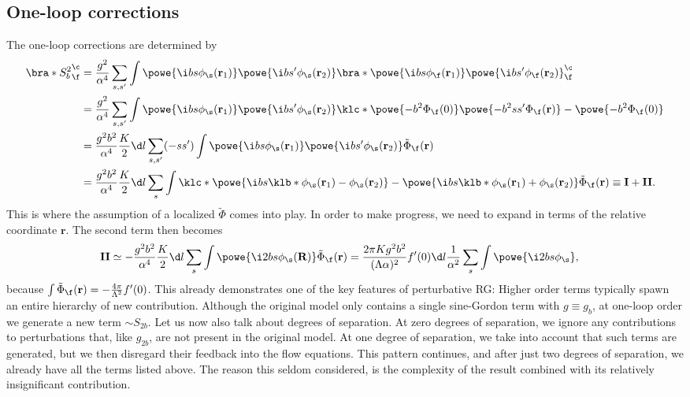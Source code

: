 \documentclass[english, parskip=full]{scrartcl}
\begin{document}
\subsection{One-loop corrections}
The one-loop corrections are determined by
\begin{align}
\bra*{S_b^2}_\f^\c &= \frac{g^2}{\alpha^4} \sum_{s,s'} \int \powe{\i bs\phi_\s(\textbf{r}_1)} \powe{\i bs'\phi_\s(\textbf{r}_2)} \bra*{\powe{\i bs\phi_\f(\textbf{r}_1)} \powe{\i bs' \phi_\f(\textbf{r}_2)}}_\f^\c\\
&= \frac{g^2}{\alpha^4} \sum_{s,s'} \int \powe{\i bs\phi_\s(\textbf{r}_1)} \powe{\i bs'\phi_\s(\textbf{r}_2)} \klc*{\powe{-b^2\Phi_\f(0)} \powe{-b^2ss' \Phi_\f(\textbf{r})} - \powe{-b^2 \Phi_\f(0)} }\\
&=\frac{g^2 b^2}{\alpha^4} \frac{K}{2}\d l \sum_{s,s'} (-ss') \int \powe{\i bs\phi_\s(\textbf{r}_1)} \powe{\i bs'\phi_\s(\textbf{r}_2)} \tilde{\Phi}_\f(\textbf{r})\\
&= \frac{g^2b^2}{\alpha^4} \frac{K}{2} \d l \sum_s \int \klc*{\powe{\i bs \klb*{\phi_\s(\textbf{r}_1) - \phi_\s(\textbf{r}_2)}} - \powe{\i bs \klb*{\phi_\s(\textbf{r}_1) + \phi_\s(\textbf{r}_2)}}} \tilde{\Phi}_\f(\textbf{r}) \equiv \textbf{I} + \textbf{II}.
\end{align}
This is where the assumption of a localized $\tilde{\Phi}$ comes into play.
In order to make progress, we need to expand in terms of the relative coordinate $\textbf{r}$.
The second term then becomes
\begin{align}
\textbf{II} &\simeq -\frac{g^2b^2}{\alpha^4} \frac{K}{2} \d l \sum_s \int \powe{\i 2bs \phi_\s(\textbf{R})} \tilde{\Phi}_\f(\textbf{r}) = \frac{2\pi K g^2 b^2}{(\Lambda\alpha)^2} f'(0) \d l \frac{1}{\alpha^2} \sum_s \int \powe{\i 2bs \phi_\s},
\end{align}
because $\int \tilde{\Phi}_\f(\textbf{r}) = -\frac{4\pi}{\Lambda^2} f'(0)$.
This already demonstrates one of the key features of perturbative RG: Higher order terms typically spawn an entire hierarchy of new contribution.
Although the original model only contains a single sine-Gordon term with $g\equiv g_b$, at one-loop order we generate a new term $\sim S_{2b}$.
Let us now also talk about degrees of separation.
At zero degrees of separation, we ignore any contributions to perturbations that, like $g_{2b}$, are not present in the original model.
At one degree of separation, we take into account that such terms are generated, but we then disregard their feedback into the flow equations.
This pattern continues, and after just two degrees of separation, we already have all the terms listed above.
The reason this seldom considered, is the complexity of the result combined with its relatively insignificant contribution.
\end{document}

